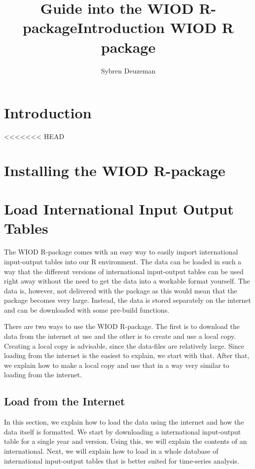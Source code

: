 \documentclass[10pt,a4paper]{paper}
\title{Guide into the WIOD R-package}
\title{Introduction WIOD R package}
\author{Sybren Deuzeman}
\begin{document}
	\maketitle
	
	\section{Introduction}
	
<<<<<<< HEAD
	\section{Installing the WIOD R-package}
	
	\section{Load International Input Output Tables}
	
	The WIOD R-package comes with an easy way to easily import international input-output tables into our R environment. The data can be loaded in such a way that the different versions of international input-output tables can be used right away without the need to get the data into a workable format yourself. The data is, however, not delivered with the package as this would mean that the package becomes very large. Instead, the data is stored separately on the internet and can be downloaded with some pre-build functions. 
	
	There are two ways to use the WIOD R-package. The first is to download the data from the internet at use and the other is to create and use a local copy. Creating a local copy is advisable, since the data-files are relatively large. Since loading from the internet is the easiest to explain, we start with that. After that, we explain how to make a local copy and use that in a way very similar to loading from the internet.
	
	\subsection{Load from the Internet}
	
	In this section, we explain how to load the data using the internet and how the data itself is formatted. We start by downloading a international input-output table for a single year and version. Using this, we will explain the contents of an international. Next, we will explain how to load in a whole database of international input-output tables that is better suited for time-series analysis.
	
\end{document}
